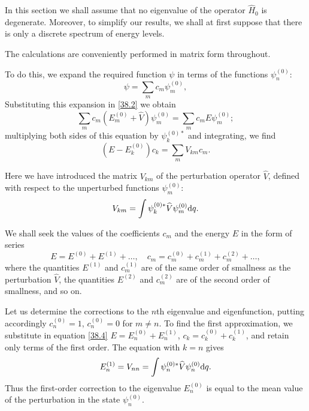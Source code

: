 In this section we shall assume that no eigenvalue of the operator $ \hat{H}_0 $ is degenerate. Moreover, to simplify our results, we shall at first suppose that there is only a discrete spectrum of energy levels.

The calculations are conveniently performed in matrix form throughout.

To do this, we expand the required function $\psi$ in terms of the functions $ \psi_n^{(0)} $:
\begin{equation}\label{38.3}
\psi=\sum_mc_m\psi_m^{(0)},
\end{equation}
Substituting this expansion in \eqref{38.2} we obtain
\[ \sum_mc_m(E_m^{(0)}+\hat{V})\psi_m^{(0)}=\sum_mc_mE\psi_m^{(0)}; \]
multiplying both sides of this equation by $\psi_k^{(0)*}$ and integrating, we find
\begin{equation}\label{38.4}
(E-E_k^{(0)})c_k=\sum_mV_{km}c_m.
\end{equation}


Here we have introduced the matrix $ V_{km} $ of the perturbation operator $\hat{V}$, defined with respect to the unperturbed functions $\psi_m^{(0)}$:
\begin{equation}\label{38.5}
V_{km}=\int\psi_k^{(0)*}\widehat{V}\psi_m^{(0)}\mathrm{d} q.
\end{equation}


We shall seek the values of the coefficients $ c_m $ and the energy $ E $ in the form of series
\[ E=E^{(0)}+E^{(1)}+\dots,\quad c_m=c_m^{(0)}+c_m^{(1)}+c_m^{(2)}+\dots, \]
where the quantities $ E^{(1)} $ and $ c_m^{(1)} $ are of the same order of smallness as the perturbation $\hat{V}$, the quantities $ E^{(2)} $ and $ c_m^{(2)} $ are of the second order of smallness, and so on.

Let us determine the corrections to the $ n $th eigenvalue and eigenfunction, putting accordingly $ c_n^{(0)} = 1 $, $ c_n^{(0)} = 0 $ for $ m \neq n $. To find the first approximation, we substitute in equation \eqref{38.4} $ E = E_n^{(0)} + E_n^{(1)} $, $ c_k = c_k^{(0)}+c_k^{(1)} $, and retain only terms of the first order. The equation with $ k = n $ gives
\begin{equation}\label{38.6}
E_n^{(1)}=V_{nn}=\int\psi_n^{(0)*}\widehat{V}\psi_n^{(0)}\mathrm{d} q.
\end{equation}
Thus the first-order correction to the eigenvalue $ E_n^{(0)} $ is equal to the mean value of the perturbation in the state $  \psi_n^{(0)} $.

